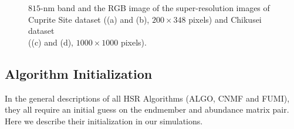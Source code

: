 \begin{figure}[t]
    \centering
    \caption{$815$-nm band and the RGB image of the super-resolution images of \\
             Cuprite Site dataset ((a) and (b), $200\times348$ pixels) and
             Chikusei dataset\\((c) and (d), $1000\times1000$ pixels).}
\label{fig:real_HSI_images}
\end{figure}

\subsection{Algorithm Initialization} \label{sec:initialization}
In the general descriptions of all HSR Algorithms (ALGO, CNMF and FUMI),
they all require an initial guess on the endmember and abundance matrix pair.
Here we describe their initialization in our simulations.

